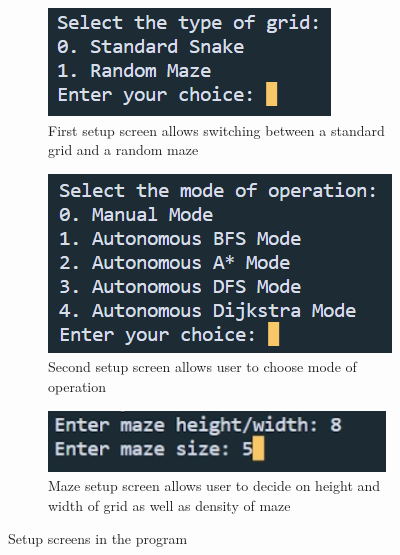 \documentclass[11pt]{article}
\begin{document}
\begin{figure}[H]
\centering

\begin{subfigure}{0.3\textwidth}
    \centering
    \includegraphics[scale=0.5]{Setup_1} 
    \caption{First setup screen allows switching between a standard grid and a random maze}
    \label{fig:subim1}
\end{subfigure}
\begin{subfigure}{0.3\textwidth}
    \centering
    \includegraphics[scale=0.5]{Setup_2}
    \caption{Second setup screen allows user to choose mode of operation}
    \label{fig:subim2}
\end{subfigure}
\begin{subfigure}{0.3\textwidth}
    \centering
    \includegraphics[scale=0.5]{Maze_Generation}
    \caption{Maze setup screen allows user to decide on height and width of grid as well as density of maze}
    \label{fig:subim3}
\end{subfigure}

\caption{Setup screens in the program}
\label{fig:image1}
\end{figure}
\end{document}
